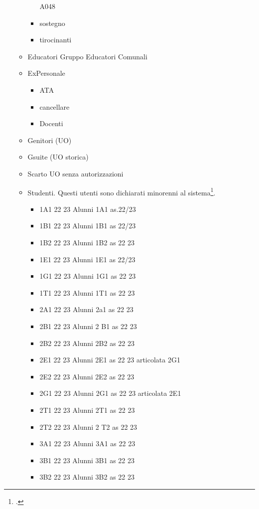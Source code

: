 \begin{itemize}
\begin{itemize}
\begin{itemize}
		A048 
		\item sostegno
		\item tirocinanti
		\end{itemize}
\item  Educatori
Gruppo Educatori Comunali
\item ExPersonale
\begin{itemize}
	\item ATA
	\item cancellare
	\item Docenti
\end{itemize}
\item Genitori (UO)
\item Gsuite (UO storica)
\item Scarto UO senza autorizzazioni
\item Studenti. Questi utenti sono dichiarati minorenni al sistema\footcite{Google2021b}.
\begin{itemize}
	\item 1A1 22 23
	Alunni 1A1 as.22/23
	\item 1B1 22 23
	Alunni 1B1 as 22/23
	\item 1B2 22 23
	Alunni 1B2 as 22 23
	\item 1E1 22 23
	Alunni 1E1 as 22/23	
	\item 1G1 22 23
	Alunni 1G1 as 22 23	
	\item 1T1 22 23
	Alunni 1T1 as 22 23	
	\item 2A1 22 23
	Alunni 2a1 as 22 23	
	\item 2B1 22 23
	Alunni 2 B1 as 22 23	
	\item 2B2 22 23
	Alunni 2B2 as 22 23	
	\item 2E1 22 23
	Alunni 2E1 as 22 23 articolata 2G1	
	\item 2E2 22 23
	Alunni 2E2 as 22 23	
	\item 2G1 22 23
	Alunni 2G1 as 22 23 articolata 2E1	
	\item 2T1 22 23
	Alunni 2T1 as 22 23	
	\item 2T2 22 23
	Alunni 2 T2 as 22 23	
	\item 3A1 22 23
	Alunni 3A1 as 22 23	
	\item 3B1 22 23
	Alunni 3B1 as 22 23	
	\item 3B2 22 23
	Alunni 3B2 as 22 23	

\end{itemize}
\end{itemize}
\end{itemize}
